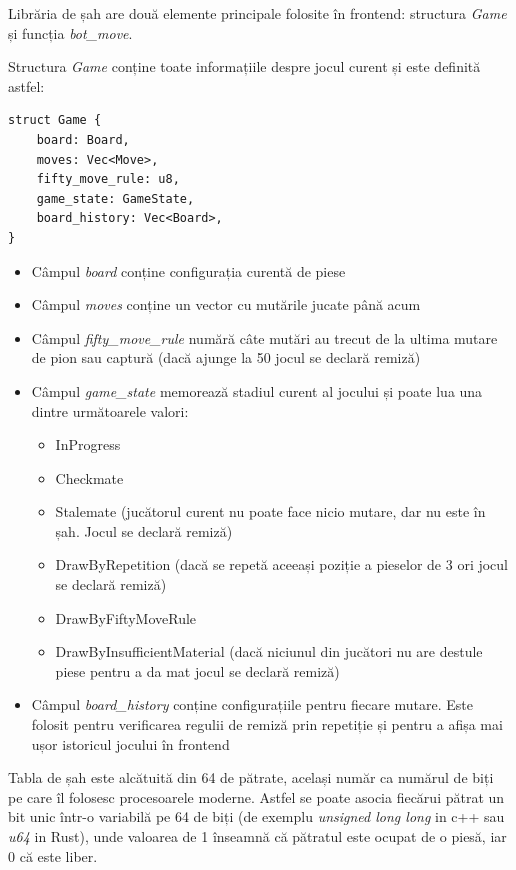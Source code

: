 Librăria de șah are două elemente principale folosite în frontend:
structura \textit{Game} și funcția \textit{bot\_move}.

Structura \textit{Game} conține toate informațiile despre jocul curent și este definită astfel:
\begin{lstlisting}[language=RustHtml]
struct Game {
    board: Board,
    moves: Vec<Move>,
    fifty_move_rule: u8,
    game_state: GameState,
    board_history: Vec<Board>,
}
\end{lstlisting}

\begin{itemize}
	\item Câmpul \textit{board} conține configurația curentă de piese
	\item Câmpul \textit{moves} conține un vector cu mutările jucate până acum
	\item Câmpul \textit{fifty\_move\_rule} numără câte mutări au trecut de la ultima
	      mutare de pion sau captură (dacă ajunge la 50 jocul se declară remiză)
	\item Câmpul \textit{game\_state} memorează stadiul curent al jocului și poate lua
	      una dintre următoarele valori:
	      \begin{itemize}
		      \item InProgress
		      \item Checkmate
		      \item Stalemate (jucătorul curent nu poate face nicio mutare, dar nu este în șah.
		            Jocul se declară remiză)
		      \item DrawByRepetition (dacă se repetă aceeași poziție a pieselor de 3 ori jocul
		            se declară remiză)
		      \item DrawByFiftyMoveRule
		      \item DrawByInsufficientMaterial (dacă niciunul din jucători nu are destule piese
		            pentru a da mat jocul se declară remiză)
	      \end{itemize}
	\item Câmpul \textit{board\_history} conține configurațiile pentru fiecare mutare.
	      Este folosit pentru verificarea regulii de remiză prin repetiție și pentru
	      a afișa mai ușor istoricul jocului în frontend
\end{itemize}
\vspace{1cm}

Tabla de șah este alcătuită din 64 de pătrate, același număr ca numărul de biți pe care
îl folosesc procesoarele moderne. Astfel se poate asocia fiecărui pătrat un bit unic într-o
variabilă pe 64 de biți (de exemplu \textit{unsigned long long} in c++ sau \textit{u64} in Rust),
unde valoarea de 1 înseamnă că pătratul este ocupat de o piesă, iar 0 că este liber.

